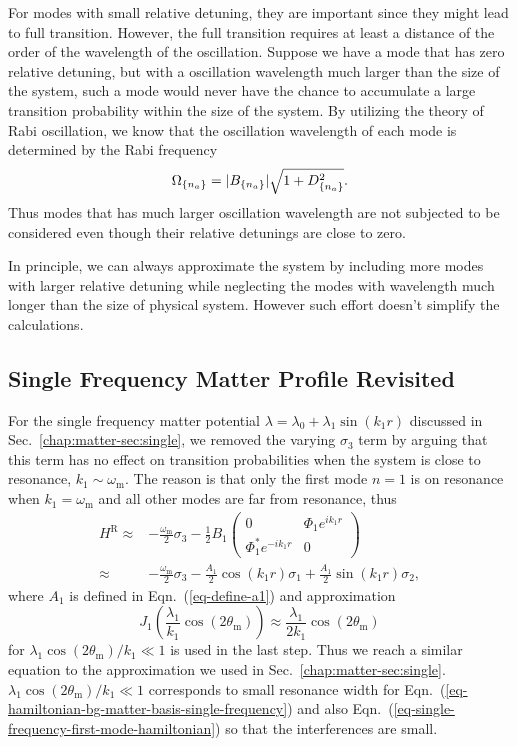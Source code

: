 For modes with small relative detuning, they are important since they might lead to full transition. However, the full transition requires at least a distance of the order of the wavelength of the oscillation. Suppose we have a mode that has zero relative detuning, but with a oscillation wavelength much larger than the size of the system, such a mode would never have the chance to accumulate a large transition probability within the size of the system. By utilizing the theory of Rabi oscillation, we know that the oscillation wavelength of each mode is determined by the Rabi frequency
\begin{equation}
\Omega_{\{n_a\}} = \lvert B_{\{n_a\}} \rvert \sqrt{1+D_{\{n_a\}}^2}.
\end{equation}
Thus modes that has much larger oscillation wavelength are not subjected to be considered even though their relative detunings are close to zero.

In principle, we can always approximate the system by including more modes with larger relative detuning while neglecting the modes with wavelength much longer than the size of physical system. However such effort doesn't simplify the calculations.


\subsection{\label{sec:single-revisted}Single Frequency Matter Profile Revisited}

For the single frequency matter potential $\lambda = \lambda_0 + \lambda_1 \sin(k_1 r)$ discussed in Sec.~\ref{chap:matter-sec:single}, we removed the varying $\sigma_3$ term by arguing that this term has no effect on transition probabilities when the system is close to resonance, $k_1 \sim \omega_{\mathrm m}$. The reason is that only the first mode $n=1$ is on resonance when $k_1=\omega_{\mathrm m}$ and all other modes are far from resonance, thus
\begin{align}
H^{\mathrm R} \approx & -\frac{\omega_{\mathrm m}}{2}\sigma_3 - \frac{1}{2} B_1 \begin{pmatrix}
0 & \Phi_1 e^{i k_1 r} \\
\Phi_1^* e^{-ik_1r} & 0
\end{pmatrix}\label{eq-single-frequency-first-mode-hamiltonian} \\
\approx & -\frac{\omega_{\mathrm m}}{2} \sigma_3 - \frac{A_1}{2} \cos(k_1 r) \sigma_1 + \frac{A_1}{2} \sin(k_1 r) \sigma_2\nonumber,
\end{align}
where $A_1$ is defined in Eqn.~(\ref{eq-define-a1}) and approximation
\begin{equation*}
J_1\left( \frac{\lambda_1}{k_1}\cos (2\theta_{\mathrm m}) \right) \approx \frac{\lambda_1}{2k_1}\cos (2\theta_{\mathrm m})
\end{equation*}
for $\lambda_1\cos(2\theta_{\mathrm m})/k_1\ll 1$ is used in the last step. Thus we reach a similar equation to the approximation we used in Sec.~\ref{chap:matter-sec:single}. $\lambda_1\cos(2\theta_{\mathrm m})/k_1\ll 1$ corresponds to small resonance width for Eqn.~(\ref{eq-hamiltonian-bg-matter-basis-single-frequency}) and also Eqn.~(\ref{eq-single-frequency-first-mode-hamiltonian}) so that the interferences are small.


